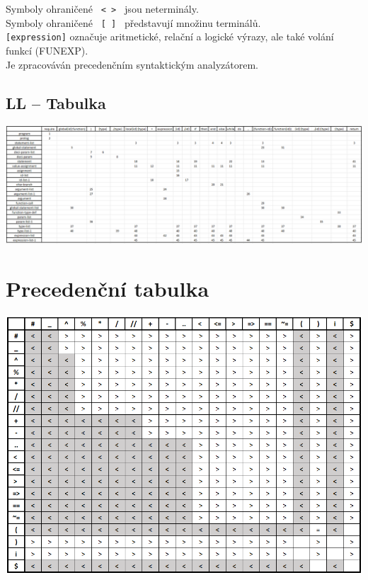 \documentclass[11pt]{article}
\begin{document}
            Symboly ohraničené \verb| < > | jsou neterminály. \\
            Symboly ohraničené \verb| [ ] | představují množinu terminálů. \\
            \verb|[expression]| označuje aritmetické, relační a logické výrazy, ale také volání funkcí (FUNEXP).\\
            Je zpracováván precedenčním syntaktickým analyzátorem.
            \pagebreak
    \restoregeometry
    
    \begin{landscape}
        \hspace{5cm}
        \vspace{2.5cm}
        \begin{centering}
            \section{LL -- Tabulka}
                \includegraphics[width=1\linewidth]{lltable.png}
        \end{centering}
    \end{landscape}
    
    
    \pagebreak
    \section{Precedenční tabulka}
        \includegraphics[width=1\linewidth]{precedenční tabulka.png}
        \pagebreak
\end{document}
